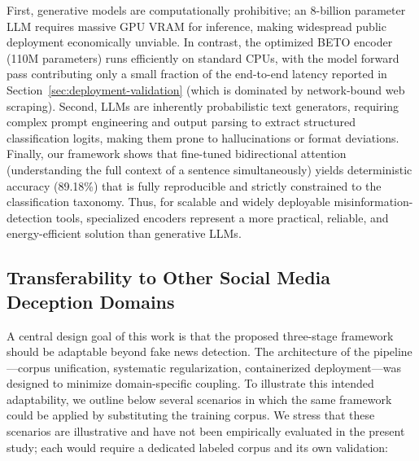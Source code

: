 \documentclass[informatics,article,submit,pdftex,moreauthors]{Definitions/mdpi}
\begin{document}
First, generative models are computationally prohibitive; an 8-billion parameter LLM requires massive GPU VRAM for inference, making widespread public deployment economically unviable. In contrast, the optimized BETO encoder (110M parameters) runs efficiently on standard CPUs, with the model forward pass contributing only a small fraction of the end-to-end latency reported in Section~\ref{sec:deployment-validation} (which is dominated by network-bound web scraping). Second, LLMs are inherently probabilistic text generators, requiring complex prompt engineering and output parsing to extract structured classification logits, making them prone to hallucinations or format deviations. Finally, our framework shows that fine-tuned bidirectional attention (understanding the full context of a sentence simultaneously) yields deterministic accuracy (89.18\%) that is fully reproducible and strictly constrained to the classification taxonomy. Thus, for scalable and widely deployable misinformation-detection tools, specialized encoders represent a more practical, reliable, and energy-efficient solution than generative LLMs.

\subsection{Transferability to Other Social Media Deception Domains}
A central design goal of this work is that the proposed three-stage framework should be adaptable beyond fake news detection. The architecture of the pipeline—corpus unification, systematic regularization, containerized deployment—was designed to minimize domain-specific coupling. To illustrate this intended adaptability, we outline below several scenarios in which the same framework could be applied by substituting the training corpus. We stress that these scenarios are illustrative and have not been empirically evaluated in the present study; each would require a dedicated labeled corpus and its own validation:
\end{document}
